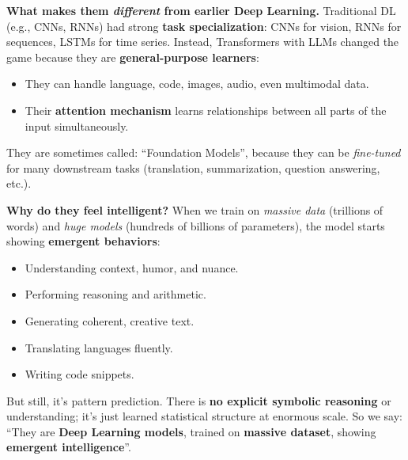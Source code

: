 \begin{deepeningbox}
    \highspace
    \textcolor{Green3}{ \textbf{What makes them \emph{different} from earlier Deep Learning.}} Traditional DL (e.g., CNNs, RNNs) had strong \textbf{task specialization}: CNNs for vision, RNNs for sequences, LSTMs for time series. Instead, Transformers with LLMs changed the game because they are \textbf{general-purpose learners}:
    \begin{itemize}
        \item They can handle language, code, images, audio, even multimodal data.
        \item Their \textbf{attention mechanism} learns relationships between all parts of the input simultaneously.
    \end{itemize}
    They are sometimes called: ``Foundation Models'', because they can be \emph{fine-tuned} for many downstream tasks (translation, summarization, question answering, etc.).

    \highspace
    \textcolor{Green3}{ \textbf{Why do they feel intelligent?}} When we train on \emph{massive data} (trillions of words) and \emph{huge models} (hundreds of billions of parameters), the model starts showing \textbf{emergent behaviors}:
    \begin{itemize}
        \item Understanding context, humor, and nuance.
        \item Performing reasoning and arithmetic.
        \item Generating coherent, creative text.
        \item Translating languages fluently.
        \item Writing code snippets.
    \end{itemize}
    But still, it's pattern prediction. There is \textbf{no explicit symbolic reasoning} or understanding; it's just learned statistical structure at enormous scale. So we say: ``They are \textbf{Deep Learning models}, trained on \textbf{massive dataset}, showing \textbf{emergent intelligence}''.
\end{deepeningbox}